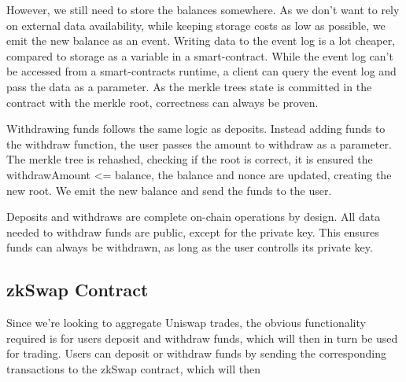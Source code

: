 \documentclass[11pt,twoside,a4paper,final]{book}
\begin{document}
However, we still need to store the balances somewhere. As we don't want to rely on external data availability, while keeping storage costs as low as possible, we emit the new balance as an event. Writing data to the event log is a lot cheaper, compared to storage as a variable in a smart-contract. While the event log can't be accessed from a smart-contracts runtime, a client can query the event log and pass the data as a parameter. As the merkle trees state is committed in the contract with the merkle root, correctness can always be proven. 

Withdrawing funds follows the same logic as deposits. Instead adding funds to the withdraw function, the user passes the amount to withdraw as a parameter. The merkle tree is rehashed, checking if the root is correct, it is ensured the withdrawAmount <= balance, the balance and nonce are updated, creating the new root. We emit the new balance and send the funds to the user. 

Deposits and withdraws are complete on-chain operations by design. All data needed to withdraw funds are public, except for the private key. This ensures funds can always be withdrawn, as long as the user controlls its private key. 

















\subsection{zkSwap Contract}
Since we're looking to aggregate Uniswap trades, the obvious functionality required is for users deposit and withdraw funds, which will then in turn be used for trading. Users can deposit or withdraw funds by sending the corresponding transactions to the zkSwap contract, which will then
\end{document}
